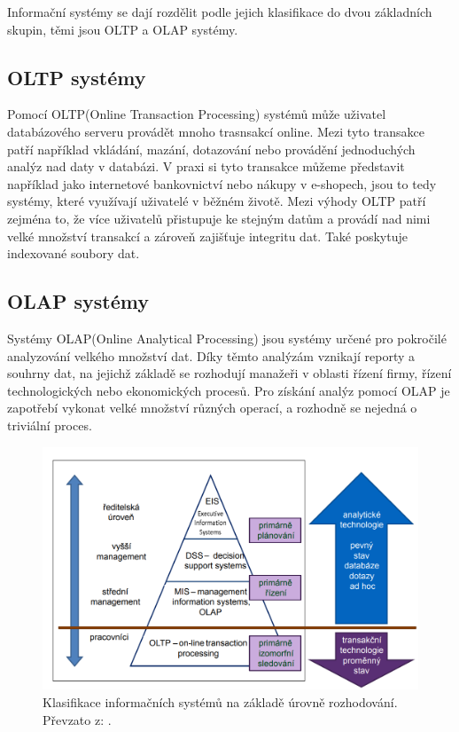  Informační systémy se dají rozdělit podle jejich klasifikace do dvou základních skupin, těmi jsou OLTP a OLAP systémy.

\subsection{OLTP systémy}

Pomocí OLTP(Online Transaction Processing) systémů může uživatel databázového serveru provádět mnoho trasnsakcí online. Mezi tyto transakce patří například vkládání, mazání, dotazování nebo provádění jednoduchých analýz nad daty v databázi. V praxi si tyto transakce můžeme představit například jako  internetové bankovnictví nebo nákupy v e-shopech, jsou to tedy systémy, které využívají uživatelé v běžném životě.
Mezi výhody OLTP patří zejména to, že více uživatelů přistupuje ke stejným datům a provádí nad nimi velké množství transakcí a zároveň zajišťuje integritu dat. Také poskytuje indexované soubory dat. \cite{oltp}

\subsection{OLAP systémy}

Systémy OLAP(Online Analytical Processing) jsou systémy určené pro pokročilé analyzování velkého množství dat. Díky těmto analýzám vznikají reporty a souhrny dat, na jejichž základě se rozhodují manažeři v oblasti řízení firmy, řízení technologických nebo ekonomických procesů. Pro získání analýz pomocí OLAP je zapotřebí vykonat velké množství různých operací, a rozhodně se nejedná o triviální proces. \cite{lacko}

\begin{figure}[H]
    \begin{center}
        \includegraphics[width=130mm]{obrazky-figures/oltpolap.png}
    \caption{ Klasifikace informačních systémů na základě úrovně rozhodování. Převzato z: \cite{isimage}.}
    \end{center}
\end{figure}

